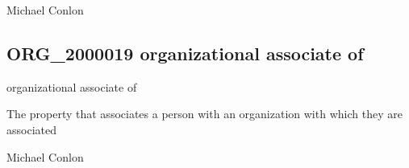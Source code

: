 \documentclass[letterpaper,10pt,english]{sphinxmanual}
\begin{document}
\begin{sphinxShadowBox}

\sphinxAtStartPar
Michael Conlon 
\end{sphinxShadowBox}
\begin{quote}

\ignorespaces \end{quote}


\subsection{ORG\_2000019 \sphinxhyphen{} organizational associate of}
\label{\detokenize{doc-ORG_2000019:org-2000019-organizational-associate-of}}\label{\detokenize{doc-ORG_2000019:index-0}}\label{\detokenize{doc-ORG_2000019::doc}}
\begin{sphinxShadowBox}

\sphinxAtStartPar
organizational associate of
\end{sphinxShadowBox}

\begin{sphinxShadowBox}

\sphinxAtStartPar
{}
\end{sphinxShadowBox}

\begin{sphinxShadowBox}

\sphinxAtStartPar
The property that associates a person with an organization with which they are associated
\end{sphinxShadowBox}

\begin{sphinxShadowBox}

\sphinxAtStartPar
Michael Conlon 
\end{sphinxShadowBox}

\begin{sphinxShadowBox}

\sphinxAtStartPar
{\hyperref[\detokenize{doc-NCBITaxon_9606::doc}]{}}
\end{sphinxShadowBox}
\end{document}
